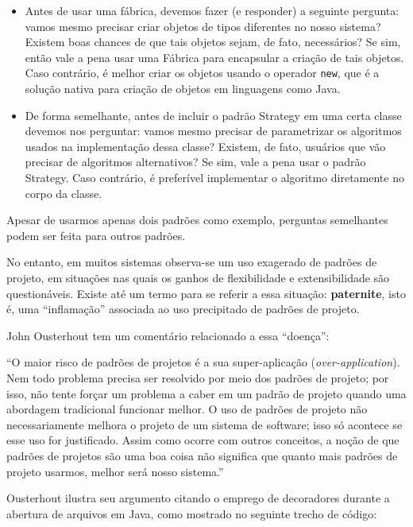 \documentclass[
  11pt,
  twoside]{book}
\newcommand{\passthrough}[1]{#1}
\renewenvironment{quote}{\centering \vspace{1.5ex} \begin{tcolorbox}[colback=backcolor, width=4.9in]}{\end{tcolorbox}}
\begin{document}
\begin{itemize}
\item
  Antes de usar uma fábrica, devemos fazer (e responder) a seguinte
  pergunta: vamos mesmo precisar criar objetos de tipos diferentes no
  nosso sistema? Existem boas chances de que tais objetos sejam, de
  fato, necessários? Se sim, então vale a pena usar uma Fábrica para
  encapsular a criação de tais objetos. Caso contrário, é melhor criar
  os objetos usando o operador \passthrough{\lstinline!new!}, que é a
  solução nativa para criação de objetos em linguagens como Java.
\item
  De forma semelhante, antes de incluir o padrão Strategy em uma certa
  classe devemos nos perguntar: vamos mesmo precisar de parametrizar os
  algoritmos usados na implementação dessa classe? Existem, de fato,
  usuários que vão precisar de algoritmos alternativos? Se sim, vale a
  pena usar o padrão Strategy. Caso contrário, é preferível implementar
  o algoritmo diretamente no corpo da classe.
\end{itemize}

Apesar de usarmos apenas dois padrões como exemplo, perguntas
semelhantes podem ser feita para outros padrões.

No entanto, em muitos sistemas observa-se um uso exagerado de padrões de
projeto, em situações nas quais os ganhos de flexibilidade e
extensibilidade são questionáveis. Existe até um termo para se referir a
essa situação: \textbf{paternite}, isto é, uma ``inflamação'' associada
ao uso precipitado de padrões de projeto.

 John Ousterhout tem um comentário relacionado a
essa ``doença'':

\begin{quote}
``O maior risco de padrões de projetos é a sua super-aplicação
(\emph{over-application}). Nem todo problema precisa ser resolvido por
meio dos padrões de projeto; por isso, não tente forçar um problema a
caber em um padrão de projeto quando uma abordagem tradicional funcionar
melhor. O uso de padrões de projeto não necessariamente melhora o
projeto de um sistema de software; isso só acontece se esse uso for
justificado. Assim como ocorre com outros conceitos, a noção de que
padrões de projetos são uma boa coisa não significa que quanto mais
padrões de projeto usarmos, melhor será nosso sistema.''
\end{quote}

Ousterhout ilustra seu argumento citando o emprego de decoradores
durante a abertura de arquivos em Java, como mostrado no seguinte trecho
de código:
\end{document}
